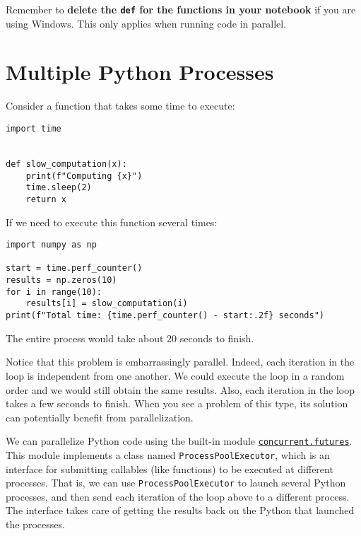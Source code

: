 \documentclass[12pt, a4paper]{article}
\begin{document}
Remember to \textbf{\textbf{delete the \texttt{def} for the functions in your notebook}} if you are using Windows.
This only applies when running code in parallel.
\section{Multiple Python Processes}
\label{sec:org112b51a}
Consider a function that takes some time to execute:
\lstset{language=jupyter-python,label= ,caption= ,captionpos=b,numbers=none}
\begin{lstlisting}
import time


def slow_computation(x):
    print(f"Computing {x}")
    time.sleep(2)
    return x
\end{lstlisting}
If we need to execute this function several times:
\lstset{language=jupyter-python,label= ,caption= ,captionpos=b,numbers=none}
\begin{lstlisting}
import numpy as np

start = time.perf_counter()
results = np.zeros(10)
for i in range(10):
    results[i] = slow_computation(i)
print(f"Total time: {time.perf_counter() - start:.2f} seconds")
\end{lstlisting}
The entire process would take about 20 seconds to finish.

Notice that this problem is embarrassingly parallel.
Indeed, each iteration in the loop is independent from one another.
We could execute the loop in a random order and we would still obtain the same results.
Also, each iteration in the loop takes a few seconds to finish.
When you see a problem of this type, its solution can potentially benefit from parallelization.

We can parallelize Python code using the built-in module \href{https://docs.python.org/3/library/concurrent.futures.html}{\texttt{concurrent.futures}}.
This module implements a class named \texttt{ProcessPoolExecutor}, which is an interface for submitting callables (like functions) to be executed at different processes.
That is, we can use \texttt{ProcessPoolExecutor} to launch several Python processes, and then send each iteration of the loop above to a different process.
The interface takes care of getting the results back on the Python that launched the processes.
\end{document}
